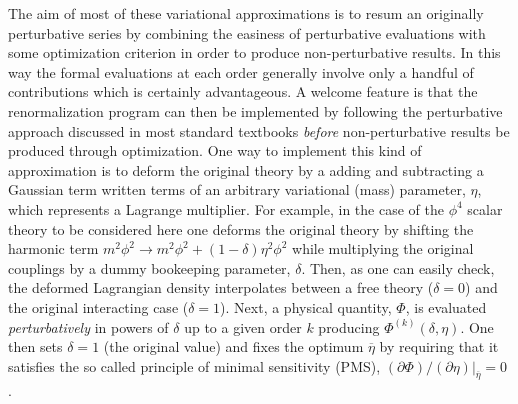 \documentclass[a4paper,11pt]{article}
\begin{document}
The aim of most of these   variational approximations  is   to resum an originally perturbative series by combining the easiness of perturbative evaluations with some optimization criterion in order to produce non-perturbative results. In this way  the formal evaluations at each order generally involve only a handful of contributions which is certainly advantageous. A welcome feature is that the  renormalization program  can then be implemented by following the perturbative approach discussed in most standard textbooks {\it before} non-perturbative  results be produced through optimization. One way to implement this kind of approximation is to deform the original theory by a adding and subtracting a Gaussian term written terms of an arbitrary variational (mass) parameter, $\eta$, which represents a Lagrange multiplier. For example, in the case of the  $\phi^4$ scalar  theory to be considered here one deforms the original theory by shifting  the harmonic term $m^2 \phi^2 \to m^2\phi^2 + (1-\delta) \eta^2 \phi^2$  while multiplying the original couplings by a dummy   bookeeping parameter, $\delta$. Then, as one can easily check, the deformed Lagrangian density  interpolates between a free theory ($\delta =0$) and the original interacting case ($\delta =1$). Next, a physical quantity, $\Phi$, is evaluated {\it perturbatively } in powers of $\delta$ up to a given order $k$ producing $\Phi^{(k)}(\delta,\eta)$. One then sets $\delta=1$ (the original value) and fixes the optimum $\overline \eta$ by requiring that it satisfies the so called principle of minimal sensitivity (PMS), $(\partial \Phi)/(\partial \eta)|_{\overline \eta} =0$ \cite{pms1,pms2}.
\end{document}
